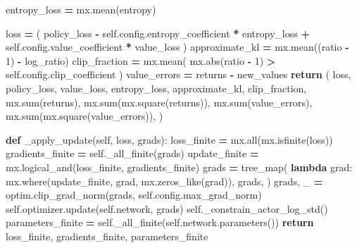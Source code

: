 \documentclass[
  chinese,
  11pt,
  letterpaper,
]{article}
\newenvironment{Shaded}{\begin{snugshade}}{\end{snugshade}}
\newcommand{\BuiltInTok}[1]{#1}
\newcommand{\ControlFlowTok}[1]{\textcolor[rgb]{0.13,0.29,0.53}{\textbf{#1}}}
\newcommand{\DecValTok}[1]{\textcolor[rgb]{0.00,0.00,0.81}{#1}}
\newcommand{\KeywordTok}[1]{\textcolor[rgb]{0.13,0.29,0.53}{\textbf{#1}}}
\newcommand{\NormalTok}[1]{#1}
\newcommand{\OperatorTok}[1]{\textcolor[rgb]{0.81,0.36,0.00}{\textbf{#1}}}
\newcommand{\VariableTok}[1]{\textcolor[rgb]{0.00,0.00,0.00}{#1}}
\renewenvironment{Shaded}{\par\smallskip}{\par\smallskip}
\begin{document}
\begin{Shaded}
\begin{Highlighting}[]
\NormalTok{        entropy\_loss }\OperatorTok{=}\NormalTok{ mx.mean(entropy)}

\NormalTok{        loss }\OperatorTok{=}\NormalTok{ (}
\NormalTok{            policy\_loss}
            \OperatorTok{{-}} \VariableTok{self}\NormalTok{.config.entropy\_coefficient }\OperatorTok{*}\NormalTok{ entropy\_loss}
            \OperatorTok{+} \VariableTok{self}\NormalTok{.config.value\_coefficient }\OperatorTok{*}\NormalTok{ value\_loss}
\NormalTok{        )}
\NormalTok{        approximate\_kl }\OperatorTok{=}\NormalTok{ mx.mean((ratio }\OperatorTok{{-}} \DecValTok{1}\NormalTok{) }\OperatorTok{{-}}\NormalTok{ log\_ratio)}
\NormalTok{        clip\_fraction }\OperatorTok{=}\NormalTok{ mx.mean(}
\NormalTok{            mx.}\BuiltInTok{abs}\NormalTok{(ratio }\OperatorTok{{-}} \DecValTok{1}\NormalTok{) }\OperatorTok{\textgreater{}} \VariableTok{self}\NormalTok{.config.clip\_coefficient}
\NormalTok{        )}
\NormalTok{        value\_errors }\OperatorTok{=}\NormalTok{ returns }\OperatorTok{{-}}\NormalTok{ new\_values}
        \ControlFlowTok{return}\NormalTok{ (}
\NormalTok{            loss,}
\NormalTok{            policy\_loss,}
\NormalTok{            value\_loss,}
\NormalTok{            entropy\_loss,}
\NormalTok{            approximate\_kl,}
\NormalTok{            clip\_fraction,}
\NormalTok{            mx.}\BuiltInTok{sum}\NormalTok{(returns),}
\NormalTok{            mx.}\BuiltInTok{sum}\NormalTok{(mx.square(returns)),}
\NormalTok{            mx.}\BuiltInTok{sum}\NormalTok{(value\_errors),}
\NormalTok{            mx.}\BuiltInTok{sum}\NormalTok{(mx.square(value\_errors)),}
\NormalTok{        )}

    \KeywordTok{def}\NormalTok{ \_apply\_update(}\VariableTok{self}\NormalTok{, loss, grads):}
\NormalTok{        loss\_finite }\OperatorTok{=}\NormalTok{ mx.}\BuiltInTok{all}\NormalTok{(mx.isfinite(loss))}
\NormalTok{        gradients\_finite }\OperatorTok{=} \VariableTok{self}\NormalTok{.\_all\_finite(grads)}
\NormalTok{        update\_finite }\OperatorTok{=}\NormalTok{ mx.logical\_and(loss\_finite, gradients\_finite)}
\NormalTok{        grads }\OperatorTok{=}\NormalTok{ tree\_map(}
            \KeywordTok{lambda}\NormalTok{ grad: mx.where(update\_finite, grad, mx.zeros\_like(grad)),}
\NormalTok{            grads,}
\NormalTok{        )}
\NormalTok{        grads, \_ }\OperatorTok{=}\NormalTok{ optim.clip\_grad\_norm(grads, }\VariableTok{self}\NormalTok{.config.max\_grad\_norm)}
        \VariableTok{self}\NormalTok{.optimizer.update(}\VariableTok{self}\NormalTok{.network, grads)}
        \VariableTok{self}\NormalTok{.\_constrain\_actor\_log\_std()}
\NormalTok{        parameters\_finite }\OperatorTok{=} \VariableTok{self}\NormalTok{.\_all\_finite(}\VariableTok{self}\NormalTok{.network.parameters())}
        \ControlFlowTok{return}\NormalTok{ loss\_finite, gradients\_finite, parameters\_finite}


\end{Highlighting}
\end{Shaded}
\end{document}
